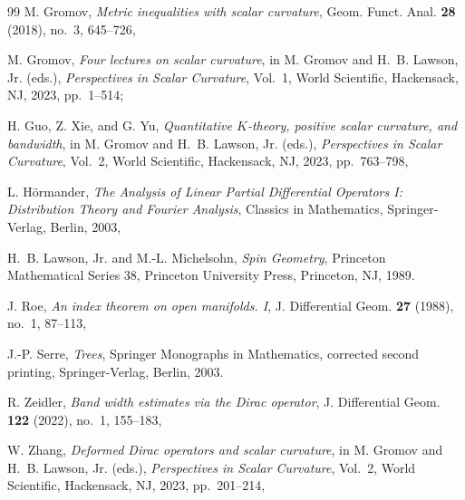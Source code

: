 \documentclass[12pt,reqno]{amsart}
\numberwithin{equation}{section}
\theoremstyle{definition}
\begin{document}
\begin{thebibliography}{99}
M. Gromov,
\emph{Metric inequalities with scalar curvature},
Geom. Funct. Anal. \textbf{28} (2018), no.~3, 645--726,

M. Gromov,
\emph{Four lectures on scalar curvature},
in M. Gromov and H.~B. Lawson, Jr. (eds.),
\emph{Perspectives in Scalar Curvature}, Vol.~1,
World Scientific, Hackensack, NJ, 2023, pp.~1--514;


H. Guo, Z. Xie, and G. Yu,
\emph{Quantitative $K$-theory, positive scalar curvature, and bandwidth},
in M. Gromov and H.~B. Lawson, Jr. (eds.),
\emph{Perspectives in Scalar Curvature}, Vol.~2,
World Scientific, Hackensack, NJ, 2023, pp.~763--798,


L. H\"ormander,
\emph{The Analysis of Linear Partial Differential Operators I:
Distribution Theory and Fourier Analysis},
Classics in Mathematics, Springer-Verlag, Berlin, 2003,

H.~B. Lawson, Jr. and M.-L. Michelsohn,
\emph{Spin Geometry}, Princeton Mathematical Series 38,
Princeton University Press, Princeton, NJ, 1989.

J. Roe,
\emph{An index theorem on open manifolds. I},
J. Differential Geom. \textbf{27} (1988), no.~1, 87--113,

J.-P. Serre,
\emph{Trees},
Springer Monographs in Mathematics, corrected second printing,
Springer-Verlag, Berlin, 2003.

R. Zeidler,
\emph{Band width estimates via the Dirac operator},
J. Differential Geom. \textbf{122} (2022), no.~1, 155--183,


W. Zhang,
\emph{Deformed Dirac operators and scalar curvature},
in M. Gromov and H.~B. Lawson, Jr. (eds.),
\emph{Perspectives in Scalar Curvature}, Vol.~2,
World Scientific, Hackensack, NJ, 2023, pp.~201--214,

\end{thebibliography}
\end{document}
